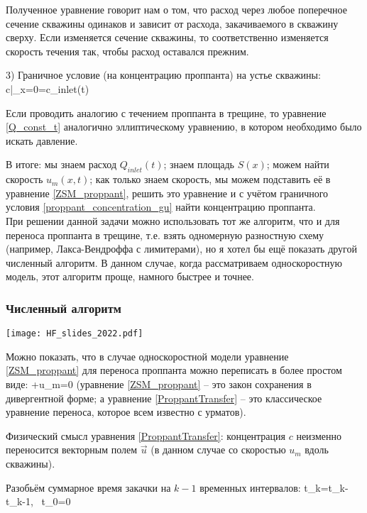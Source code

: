 \documentclass[main.tex]{subfiles}
\begin{document}
Полученное уравнение говорит нам о том, что расход через любое поперечное сечение скважины одинаков и зависит от расхода, закачиваемого в скважину сверху.
Если изменяется сечение скважины, то соответственно изменяется скорость течения так, чтобы расход оставался прежним.

3) Граничное условие (на концентрацию проппанта) на устье скважины:
\beq\label{proppant_concentration_gu}
c|_{x=0}=c_{inlet}(t)
\eeq

Если проводить аналогию с течением проппанта в трещине, то уравнение \eqref{Q_const_t} аналогично эллиптическому уравнению, в котором необходимо было искать давление.

В итоге: мы знаем расход $Q_{inlet}(t)$; знаем площадь $S(x)$; можем найти скорость $u_m(x,t)$; как только знаем скорость, мы можем подставить её в уравнение \eqref{ZSM_proppant}, решить это уравнение и с учётом граничного условия \eqref{proppant_concentration_gu} найти концентрацию проппанта.
\\

При решении данной задачи можно использовать тот же алгоритм, что и для переноса проппанта в трещине, т.е. взять одномерную разностную схему (например, Лакса-Вендроффа с лимитерами), но я хотел бы ещё показать другой численный алгоритм.
В данном случае, когда рассматриваем односкоростную модель, этот алгоритм проще, намного быстрее и точнее.
\\

\subsubsection{Численный алгоритм}

\texttt{[image: HF\_slides\_2022.pdf]}

Можно показать, что в случае односкоростной модели уравнение \eqref{ZSM_proppant} для переноса проппанта можно переписать в более простом виде:
\beq\label{ProppantTransfer}
+u_m=0
\eeq
(уравнение \eqref{ZSM_proppant} -- это закон сохранения в дивергентной форме; а уравнение \eqref{ProppantTransfer} -- это классическое уравнение переноса, которое всем известно с урматов).

Физический смысл уравнения \eqref{ProppantTransfer}: концентрация $c$ неизменно переносится векторным полем $\vec{u}$ (в данном случае со скоростью $u_m$ вдоль скважины).

Разобьём суммарное время закачки на $k-1$ временных интервалов:
\beq
\Delta t_k=t_k-t_{k-1},\,\,\,\,\,t_0=0
\eeq
\end{document}
